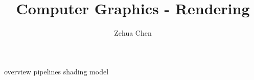 \documentclass[letterpaper, 11pt]{report}
\title{Computer Graphics - Rendering}
\author{Zehua Chen}
\begin{document}
  \maketitle
  \tableofcontents

  {overview}
  {pipelines}
  {shading}
  {model}
\end{document}
